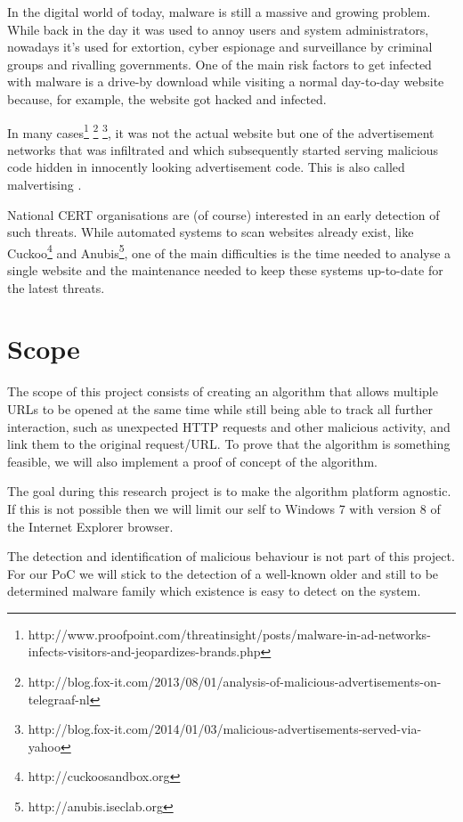 
In the digital world of today, malware is still a massive and growing problem. While back in the day it was used to annoy users and system administrators, nowadays it's used for extortion, cyber espionage and surveillance by criminal groups and rivalling governments. One of the main risk factors to get infected with malware is a drive-by download while visiting a normal day-to-day website because, for example, the website got hacked and infected. 

In many cases\footnote{http://www.proofpoint.com/threatinsight/posts/malware-in-ad-networks-infects-visitors-and-jeopardizes-brands.php} \footnote{http://blog.fox-it.com/2013/08/01/analysis-of-malicious-advertisements-on-telegraaf-nl} \footnote{http://blog.fox-it.com/2014/01/03/malicious-advertisements-served-via-yahoo}, it was not the actual website but one of the advertisement networks that was infiltrated and which subsequently started serving malicious code hidden in innocently looking advertisement code. This is also called malvertising \cite{Li2012}.

National CERT organisations are (of course) interested in an early detection of such threats. While automated systems to scan websites already exist, like Cuckoo\footnote{http://cuckoosandbox.org} and Anubis\footnote{http://anubis.iseclab.org}, one of the main difficulties is the time needed to analyse a single website and the maintenance needed to keep these systems up-to-date for the latest threats.


\section{Scope}

The scope of this project consists of creating an algorithm that allows multiple URLs to be opened at the same time while still being able to track all further interaction, such as unexpected HTTP requests and other malicious activity, and link them to the original request/URL. To prove that the algorithm is something feasible, we will also implement a proof of concept of the algorithm.

The goal during this research project is to make the algorithm platform agnostic. If this is not possible then we will limit our self to Windows 7 with version 8 of the Internet Explorer browser.

The detection and identification of malicious behaviour is not part of this project. For our PoC we will stick to the detection of a well-known older and still to be determined malware family which existence is easy to detect on the system. 

